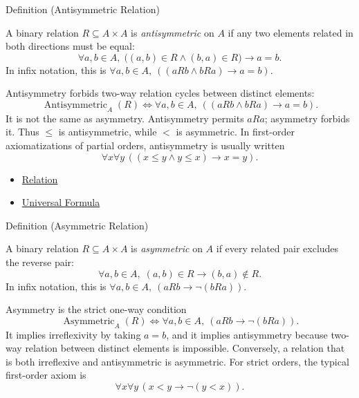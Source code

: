 \begin{definitionbox}{Definition (Antisymmetric Relation)}
\begin{definition}\label{def:antisymmetric}
A binary relation $R\subseteq A\times A$ is \emph{antisymmetric} on $A$ if any
two elements related in both directions must be equal:
\[
  \forall a,b\in A,\;
  \bigl((a,b)\in R\land(b,a)\in R\bigr)\rightarrow a=b.
\]
In infix notation, this is
$\forall a,b\in A,\ ((aRb\land bRa)\rightarrow a=b)$.
\end{definition}
\end{definitionbox}


\begin{remark*}
Antisymmetry forbids two-way relation cycles between distinct elements:
\[
  \operatorname{Antisymmetric}_A(R)
  \iff
  \forall a,b\in A,\ ((aRb\land bRa)\rightarrow a=b).
\]
It is not the same as asymmetry. Antisymmetry permits $aRa$; asymmetry forbids
it. Thus $\leq$ is antisymmetric, while $<$ is asymmetric. In first-order
axiomatizations of partial orders, antisymmetry is usually written
\[
  \forall x\forall y\,((x\leq y\land y\leq x)\rightarrow x=y).
\]
\end{remark*}

\begin{dependencies}
\begin{itemize}
  \item \hyperref[def:relation]{Relation}
  \item \hyperref[def:universal-q]{Universal Formula}
\end{itemize}
\end{dependencies}

\begin{definitionbox}{Definition (Asymmetric Relation)}
\begin{definition}\label{def:asymmetric}
A binary relation $R\subseteq A\times A$ is \emph{asymmetric} on $A$ if every
related pair excludes the reverse pair:
\[
  \forall a,b\in A,\;
  (a,b)\in R \rightarrow (b,a)\notin R.
\]
In infix notation, this is
$\forall a,b\in A,\ (aRb\rightarrow\neg(bRa))$.
\end{definition}
\end{definitionbox}


\begin{remark*}
Asymmetry is the strict one-way condition
\[
  \operatorname{Asymmetric}_A(R)
  \iff
  \forall a,b\in A,\ (aRb\rightarrow\neg(bRa)).
\]
It implies irreflexivity by taking $a=b$, and it implies antisymmetry because
two-way relation between distinct elements is impossible. Conversely, a
relation that is both irreflexive and antisymmetric is asymmetric. For strict
orders, the typical first-order axiom is
\[
  \forall x\forall y\,(x<y\rightarrow\neg(y<x)).
\]
\end{remark*}

